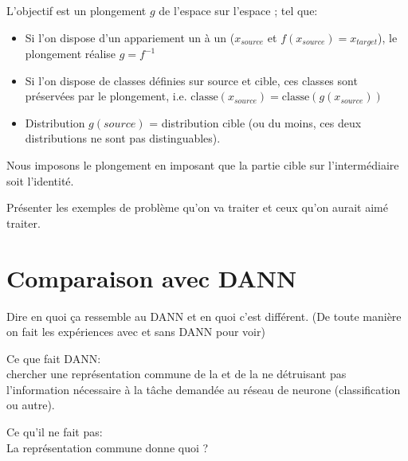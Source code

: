 L'objectif est un plongement $g$ de l'espace \source{} sur l'espace \cible{}; tel que:
\begin{itemize}
\item Si l'on dispose d'un appariement un à un ($x_{source}$ et $f(x_{source}) = x_{target}$),
	le plongement réalise $g = f^{-1}$
\item Si l'on dispose de classes définies sur source et cible,
	ces classes sont préservées par le plongement, 
	i.e. $\text{classe}(x_{source}) = \text{classe}(g(x_{source}))$
\item Distribution $g(source)$ = distribution cible 
	(ou du moins, ces deux distributions ne sont pas distinguables).
\end{itemize}

Nous imposons le plongement en imposant que la partie cible sur l'intermédiaire soit l'identité.



\TODO Présenter les exemples de problème qu'on va traiter et ceux qu'on aurait aimé traiter.



\section{Comparaison avec DANN} %
\label{sec:comparaison_avec_dann}

\TODO Dire en quoi ça ressemble au DANN et en quoi c'est différent.
\TODO (De toute manière on fait les expériences avec et sans DANN pour voir)

Ce que fait DANN:\\
chercher une représentation commune de la \source{} et de la \cible{} ne détruisant pas 
l'information nécessaire à la tâche demandée au réseau de neurone (classification ou autre).

Ce qu'il ne fait pas:\\
La représentation commune donne quoi ? \TODO






